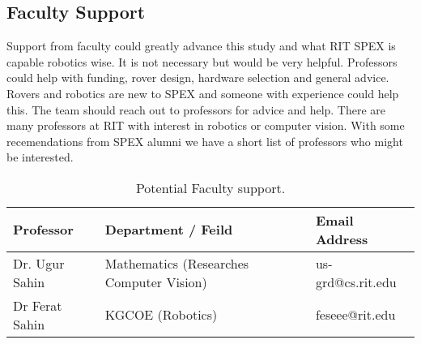 \documentclass[conference]{IEEEtran} %
\begin{document}
\subsection{Faculty Support}
Support from faculty could greatly advance this study and what RIT SPEX is capable robotics wise. It is not necessary but would be very helpful. Professors could help with funding, rover design, hardware selection and general advice. Rovers and robotics are new to SPEX and someone with experience could help this. The team should reach out to professors for advice and help. There are many professors at RIT with interest in robotics or computer vision. With some recemendations from SPEX alumni we have a short list of professors who might be interested. 


\begin{table}[hb!]
    \caption{Potential Faculty support.}
    \centering
    {\renewcommand{\arraystretch}{1.2}
    \begin{tabularx}{\linewidth}{LLL} 
    \hline
    \textbf{Professor} & \textbf{Department / Feild} & \textbf{Email Address} \\
    \hline
    Dr. Ugur Sahin & Mathematics (Researches Computer Vision) & us-grd@cs.rit.edu \\
    \hline
    Dr Ferat Sahin & KGCOE (Robotics) & feseee@rit.edu \\
    \hline
    \end{tabularx}
    }
\label{tab:fac-sup}
\end{table}
\end{document}
